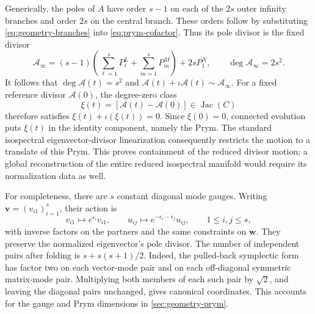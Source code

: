 Generically, the poles of $A$ have order $s-1$ on each of the $2s$
outer infinity branches and order $2s$ on the central branch.
These orders follow by substituting \cref{eq:geometry-branches}
into \cref{eq:prym-cofactor}. Thus its pole divisor is the fixed divisor
\[
 \mathcal A_\infty
 =(s-1)\left(\sum_{\ell=1}^{s}P_\ell^L
                  +\sum_{m=1}^{s}P_m^M\right)+2s P_1^N,
 \qquad \deg\mathcal A_\infty=2s^2.
\]
It follows that $\deg\mathcal A(t)=s^2$ and
$\mathcal A(t)+\iota\mathcal A(t)\sim\mathcal A_\infty$.
For a fixed reference divisor $\mathcal A(0)$, the degree-zero class
\[
 \xi(t)=[\mathcal A(t)-\mathcal A(0)]\in\operatorname{Jac}(C)
\]
therefore satisfies $\xi(t)+\iota(\xi(t))=0$.
Since $\xi(0)=0$, connected evolution puts $\xi(t)$ in the identity
component, namely the Prym. The standard isospectral
eigenvector-divisor linearization
\cite[\S3]{AdlerVanMoerbeke2018} consequently restricts the motion
to a translate of this Prym. This proves containment of the reduced
divisor motion; a global reconstruction of the entire reduced
isospectral manifold would require its normalization data as well.

For completeness, there are $s$ constant diagonal mode gauges.
Writing $\boldsymbol v=(v_{i1})_{i=1}^{s}$, their action is
\[
 v_{i1}\mapsto e^{\epsilon_i}v_{i1},\qquad
 u_{ij}\mapsto e^{-\epsilon_i-\epsilon_j}u_{ij},
 \qquad 1\leq i,j\leq s,
\]
with inverse factors on the partners and the same constraints on
$\boldsymbol w$. They preserve the normalized eigenvector's pole
divisor. The number of independent pairs after folding is
$s+s(s+1)/2$. Indeed, the pulled-back symplectic form has factor two
on each vector-mode pair and on each off-diagonal symmetric
matrix-mode pair. Multiplying both members of each such pair by
$\sqrt2$, and leaving the diagonal pairs unchanged, gives canonical
coordinates. This accounts for the gauge and Prym dimensions in
\cref{sec:geometry-prym}.
